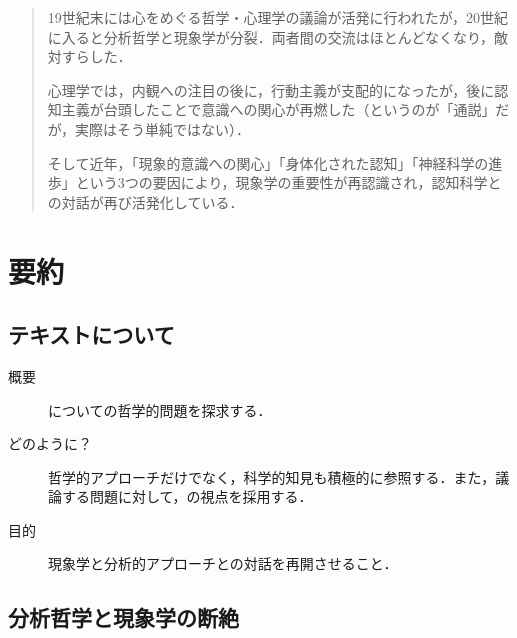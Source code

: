 \documentclass[b5j, 9pt]{ltjsarticle}
\begin{document}

\begin{abstract}
  19世紀末には心をめぐる哲学・心理学の議論が活発に行われたが，20世紀に入ると分析哲学と現象学が分裂．両者間の交流はほとんどなくなり，敵対すらした．\par
  心理学では，内観への注目の後に，行動主義が支配的になったが，後に認知主義が台頭したことで意識への関心が再燃した（というのが「通説」だが，実際はそう単純ではない）．\par
  そして近年，「現象的意識への関心」「身体化された認知」「神経科学の進歩」という3つの要因により，現象学の重要性が再認識され，認知科学との対話が再び活発化している．
\end{abstract}

\tableofcontents


\section{要約}

\subsection{テキストについて}

\begin{description}
  \item[概要] についての哲学的問題を探求する．
  \item[どのように？] 哲学的アプローチだけでなく，科学的知見も積極的に参照する．また，議論する問題に対して，の視点を採用する．
  \item[目的] 現象学と分析的アプローチとの対話を再開させること．
\end{description}


\subsection{分析哲学と現象学の断絶}
\end{document}
